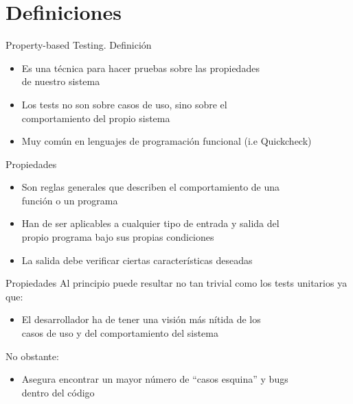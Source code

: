 \documentclass{beamer}
\begin{document}
  \section{Definiciones}
    \begin{frame}{Property-based Testing. Definición}
      \begin{itemize}
        \item Es una técnica para hacer pruebas sobre las propiedades\\
        de nuestro sistema
        \item Los tests no son sobre casos de uso, sino sobre el\\
        comportamiento del propio sistema
        \item Muy común en lenguajes de programación funcional (i.e Quickcheck)
      \end{itemize}
    \end{frame}
    \begin{frame}{Propiedades}
      \begin{itemize}
        \item Son reglas generales que describen el comportamiento de una\\
        función o un programa
        \item Han de ser aplicables a cualquier tipo de entrada y salida del\\
        propio programa bajo sus propias condiciones
        \item La salida debe verificar ciertas características deseadas
      \end{itemize}
    \end{frame}
    \begin{frame}{Propiedades}
      Al principio puede resultar no tan trivial como los tests unitarios ya que:
      \begin{itemize}
        \item El desarrollador ha de tener una visión más nítida de los\\
        casos de uso y del comportamiento del sistema
      \end{itemize}
      No obstante:
      \begin{itemize}
        \item Asegura encontrar un mayor número de ``casos esquina'' y bugs\\
        dentro del código
      \end{itemize}
    \end{frame}
\end{document}
